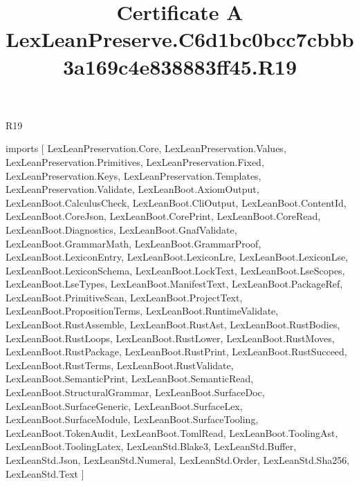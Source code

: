 \begin{lexlean}{R19}
\title{Certificate A LexLeanPreserve.C6d1bc0bcc7cbbb3a169c4e838883ff45.R19}
\begin{coremodule}
imports [
  LexLeanPreservation.Core,
  LexLeanPreservation.Values,
  LexLeanPreservation.Primitives,
  LexLeanPreservation.Fixed,
  LexLeanPreservation.Keys,
  LexLeanPreservation.Templates,
  LexLeanPreservation.Validate,
  LexLeanBoot.AxiomOutput,
  LexLeanBoot.CalculusCheck,
  LexLeanBoot.CliOutput,
  LexLeanBoot.ContentId,
  LexLeanBoot.CoreJson,
  LexLeanBoot.CorePrint,
  LexLeanBoot.CoreRead,
  LexLeanBoot.Diagnostics,
  LexLeanBoot.GnafValidate,
  LexLeanBoot.GrammarMath,
  LexLeanBoot.GrammarProof,
  LexLeanBoot.LexiconEntry,
  LexLeanBoot.LexiconLre,
  LexLeanBoot.LexiconLse,
  LexLeanBoot.LexiconSchema,
  LexLeanBoot.LockText,
  LexLeanBoot.LseScopes,
  LexLeanBoot.LseTypes,
  LexLeanBoot.ManifestText,
  LexLeanBoot.PackageRef,
  LexLeanBoot.PrimitiveScan,
  LexLeanBoot.ProjectText,
  LexLeanBoot.PropositionTerms,
  LexLeanBoot.RuntimeValidate,
  LexLeanBoot.RustAssemble,
  LexLeanBoot.RustAst,
  LexLeanBoot.RustBodies,
  LexLeanBoot.RustLoops,
  LexLeanBoot.RustLower,
  LexLeanBoot.RustMoves,
  LexLeanBoot.RustPackage,
  LexLeanBoot.RustPrint,
  LexLeanBoot.RustSucceed,
  LexLeanBoot.RustTerms,
  LexLeanBoot.RustValidate,
  LexLeanBoot.SemanticPrint,
  LexLeanBoot.SemanticRead,
  LexLeanBoot.StructuralGrammar,
  LexLeanBoot.SurfaceDoc,
  LexLeanBoot.SurfaceGeneric,
  LexLeanBoot.SurfaceLex,
  LexLeanBoot.SurfaceModule,
  LexLeanBoot.SurfaceTooling,
  LexLeanBoot.TokenAudit,
  LexLeanBoot.TomlRead,
  LexLeanBoot.ToolingAst,
  LexLeanBoot.ToolingLatex,
  LexLeanStd.Blake3,
  LexLeanStd.Buffer,
  LexLeanStd.Json,
  LexLeanStd.Numeral,
  LexLeanStd.Order,
  LexLeanStd.Sha256,
  LexLeanStd.Text
]


\end{coremodule}
\end{lexlean}

